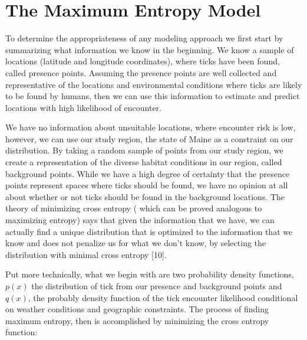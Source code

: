 
\section{The Maximum Entropy Model}

To determine the appropriateness of any modeling approach we first start by summarizing what information we know in the beginning. We know a sample of locations (latitude and longitude coordinates), where ticks have been found, called presence points. Assuming the presence points are well collected and representative of the locations and environmental conditions where ticks are likely to be found by humans, then we can use this information to estimate and predict locations with high likelihood of encounter. \newline

\noindent We have no information about unsuitable locations, where encounter risk is low, however, we can use our study region, the state of Maine as a constraint on our distribution. By taking a random sample of points from our study region, we create a representation of the diverse habitat conditions in our region, called background points. While we have a high degree of certainty that the presence points represent spaces where ticks should be found, we have no opinion at all about whether or not ticks should be found in the background locations. The theory of minimizing cross entropy ( which can be proved analogous to maximizing entropy)  says that given the information that we have, we can actually find a unique distribution that is optimized to the information that we know and does not penalize us for what we don't know, by selecting the distribution with minimal cross entropy [10].\newline


\noindent Put more technically, what we begin with are two probability density functions, $p(x)$ the distribution of tick from our presence and background points and $q(x)$, the probably density function of the tick encounter likelihood conditional on weather conditions and geographic constraints. The process of finding maximum entropy, then is  accomplished by minimizing the cross entropy function:  \newline

